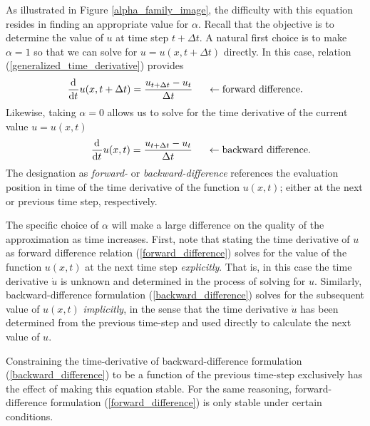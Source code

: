 As illustrated in Figure \ref{alpha_family_image}, the difficulty with this equation resides in finding an appropriate value for $\alpha$.  Recall that the objective is to determine the value of $u$ at time step $t+\Delta t$.  A natural first choice is to make $\alpha = 1$ so that we can solve for $u = u(x,t+\Delta t)$ directly.  In this case, relation (\ref{generalized_time_derivative}) provides 
\begin{align}
  \label{forward_difference}
  \frac{\mathrm{d}^{} }{\mathrm{d} t^{} } u(x,t+\Delta t) = \frac{u_{t+\Delta t} - u_t}{\Delta t} \hspace{5mm} \leftarrow \text{forward difference}.
\end{align}
Likewise, taking $\alpha = 0$ allows us to solve for the time derivative of the current value $u = u(x,t)$ 
\begin{align}
  \label{backward_difference}
  \phantom{tt + \Delta t} \frac{\mathrm{d}^{} }{\mathrm{d} t^{} } u(x,t) = \frac{u_{t + \Delta t} - u_t}{\Delta t} \hspace{5mm} \leftarrow \text{backward difference}.
\end{align}
The designation as \emph{forward-} or \emph{backward-difference} references the evaluation position in time of the time derivative of the function $u(x,t)$; either at the next or previous time step, respectively.

The specific choice of $\alpha$ will make a large difference on the quality of the approximation as time increases.  First, note that stating the time derivative of $u$ as forward difference relation (\ref{forward_difference}) solves for the value of the function $u(x,t)$ at the next time step \emph{explicitly}.  That is, in this case the time derivative $\dot{u}$ is unknown and determined in the process of solving for $u$.  Similarly, backward-difference formulation (\ref{backward_difference}) solves for the subsequent value of $u(x, t)$ \emph{implicitly}, in the sense that the time derivative $\dot{u}$ has been determined from the previous time-step and used directly to calculate the next value of $u$.

Constraining the time-derivative of backward-difference formulation (\ref{backward_difference}) to be a function of the previous time-step exclusively has the effect of making this equation stable.  For the same reasoning, forward-difference formulation (\ref{forward_difference}) is only stable under certain conditions.

